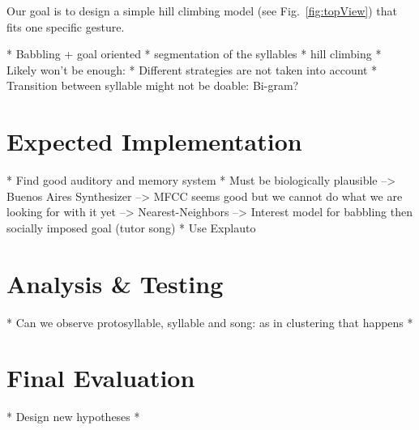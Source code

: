 \documentclass[a4paper, 11pt]{article}
\begin{document}
Our goal is to design a simple hill climbing model (see Fig.~\ref{fig:topView})
that fits one specific gesture.

\begin{figure}[tb]
\end{figure}

\ifx
* Babbling + goal oriented
* segmentation of the syllables
* hill climbing
* Likely won't be enough:
  * Different strategies are not taken into account
  * Transition between syllable might not be doable: Bi-gram?
\fi

\section*{Expected Implementation}

\ifx
* Find good auditory and memory system
  * Must be biologically plausible
  --> Buenos Aires Synthesizer
  --> MFCC seems good but we cannot do what we are looking for with it yet
  --> Nearest-Neighbors
  --> Interest model for babbling then socially imposed goal (tutor song)
    \parencite{baranes_active_2013}
* Use Explauto \parencite{moulin-frier_explauto:_2014}
\fi

\section*{Analysis \& Testing}


\ifx
* Can we observe protosyllable, syllable and song: as in clustering that happens
*
\fi

\section*{Final Evaluation}
\ifx
* Design new hypotheses
*
\fi


\printbibliography{}
\end{document}
